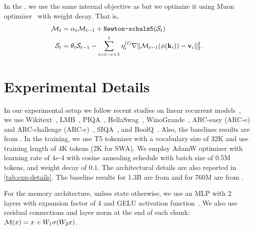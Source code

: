 \subsection{\model}
In the \model, we use the same internal objective as \omodel{} but we optimize it using Muon optimizer~\citep{jordan2024muon} with weight decay. That is, 
\begin{align}
    \mathcal{M}_{t} &= \alpha_t\mathcal{M}_{t-1} + \texttt{Newton-schulz5}(\mathcal{S}_t)\\
    \mathcal{S}_t &= \theta_t \mathcal{S}_{t-1} - \sum_{i = t - c + 1}^{t}  \eta^{(t)}_i \nabla \| \mathcal{M}_{t-1}(\phi(\mathbf{k}_i)) - \mathbf{v}_i \|^{2}_2.
\end{align}





\section{Experimental Details} \label{app:exp-details}
In our experimental setup we follow recent studies on linear recurrent models~\citep{yang2024gated, behrouz2024titans, behrouz2025Miras}, we use Wikitext~\citep{merity2017pointer}, LMB~\citep{paperno-etal-2016-lambada}, PIQA~\citep{bisk2020piqa}, HellaSwag~\citep{zellers-etal-2019-hellaswag}, WinoGrande~\citep{sakaguchi2021winogrande},  ARC-easy (ARC-e) and ARC-challenge (ARC-c)~\citep{clark2018think}, SIQA~\citep{sap-etal-2019-social}, and BoolQ~\citep{clark-etal-2019-boolq}. Also, the baselines results are from \citet{behrouz2025Miras, behrouz2024titans}. In the training, we use T5 tokenizer with a vocabulary size of 32K and use training length of 4K tokens (2K for SWA). We employ AdamW optimizer with learning rate of $4e$-$4$ with cosine annealing schedule with batch size of 0.5M tokens, and weight decay of $0.1$. The architectural details are also reported in \autoref{tab:exp-details}. The baseline results for 1.3B are from \citet{yang2024gated} and for 760M are from
\citet{behrouz2024titans, behrouz2025Miras}.

For the memory architecture, unless state otherwise, we use an MLP with $2$ layers with expansion factor of 4 and GELU activation function~\citep{hendrycks2016gaussian}. We also use residual connections and layer norm at the end of each chunk: $\mathcal{M}(x) = x + W_1 \sigma(W_2 x)$. 


